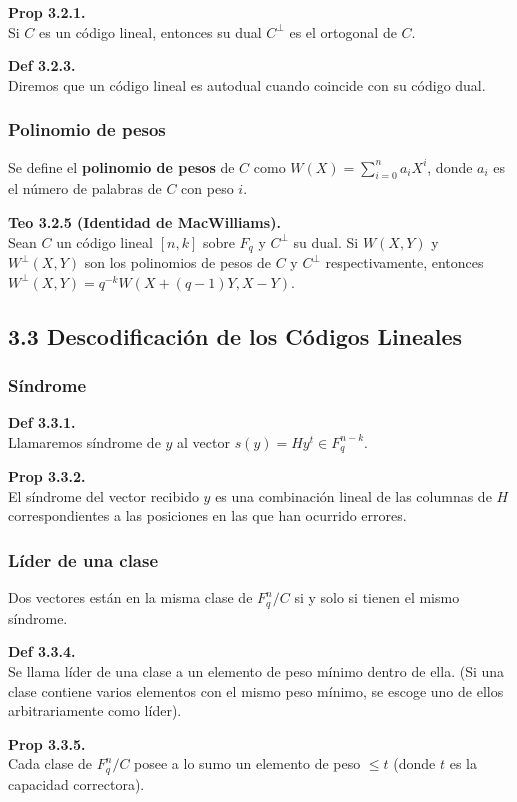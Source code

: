 \documentclass{article}
\begin{document}
\textbf{Prop 3.2.1.}\\
Si $C$ es un código lineal, entonces su dual $C^{\perp}$ es el ortogonal de $C$.

\textbf{Def 3.2.3.}\\
Diremos que un código lineal es autodual cuando coincide con su código dual.

\subsubsection{Polinomio de pesos}
Se define el \textbf{polinomio de pesos} de $C$ como $W(X) = \sum_{i=0}^{n} a_{i}X^{i}$, donde $a_{i}$ es el número de palabras de $C$ con peso $i$.

\textbf{Teo 3.2.5 (Identidad de MacWilliams).}\\
Sean $C$ un código lineal $[n, k]$ sobre $F_{q}$ y $C^{\perp}$ su dual. Si $W(X, Y)$ y $W^{\perp}(X, Y)$ son los polinomios de pesos de $C$ y $C^{\perp}$ respectivamente, entonces $W^{\perp}(X, Y) = q^{-k}W(X+(q-1)Y, X-Y)$.

\subsection{3.3 Descodificación de los Códigos Lineales}
\subsubsection{Síndrome}
\textbf{Def 3.3.1.}\\
Llamaremos síndrome de $y$ al vector $s(y) = Hy^{t} \in F_{q}^{n-k}$.

\textbf{Prop 3.3.2.}\\
El síndrome del vector recibido $y$ es una combinación lineal de las columnas de $H$ correspondientes a las posiciones en las que han ocurrido errores.

\subsubsection{Líder de una clase}
Dos vectores están en la misma clase de $F_{q}^{n}/C$ si y solo si tienen el mismo síndrome.

\textbf{Def 3.3.4.}  \\
Se llama líder de una clase a un elemento de peso mínimo dentro de ella. (Si una clase contiene varios elementos con el mismo peso mínimo, se escoge uno de ellos arbitrariamente como líder).

\textbf{Prop 3.3.5.} \\
Cada clase de $F_{q}^{n}/C$ posee a lo sumo un elemento de peso $\le t$ (donde $t$ es la capacidad correctora).
\end{document}
